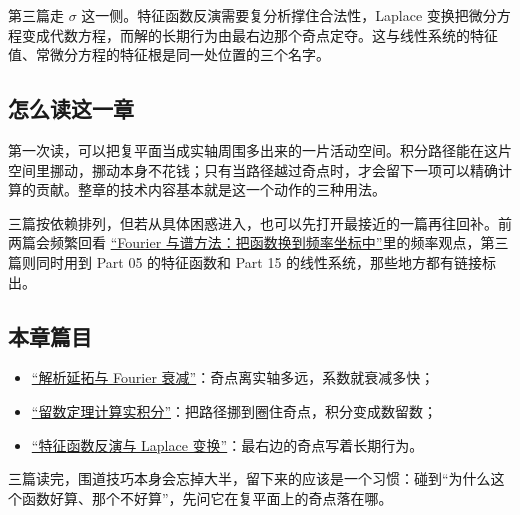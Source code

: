 第三篇走 \(\sigma\) 这一侧。特征函数反演需要复分析撑住合法性，Laplace 变换把微分方程变成代数方程，而解的长期行为由最右边那个奇点定夺。这与线性系统的特征值、常微分方程的特征根是同一处位置的三个名字。

\subsection{怎么读这一章}

第一次读，可以把复平面当成实轴周围多出来的一片活动空间。积分路径能在这片空间里挪动，挪动本身不花钱；只有当路径越过奇点时，才会留下一项可以精确计算的贡献。整章的技术内容基本就是这一个动作的三种用法。

三篇按依赖排列，但若从具体困惑进入，也可以先打开最接近的一篇再往回补。前两篇会频繁回看 \hyperref[ch:068]{``Fourier 与谱方法：把函数换到频率坐标中''}里的频率观点，第三篇则同时用到 Part 05 的特征函数和 Part 15 的线性系统，那些地方都有链接标出。

\subsection{本章篇目}

\begin{itemize}
\tightlist
\item \hyperref[sec:08-Numerical-Analysis/09-Complex-Analysis-and-Residues/01]{``解析延拓与 Fourier 衰减''}：奇点离实轴多远，系数就衰减多快；
\item \hyperref[sec:08-Numerical-Analysis/09-Complex-Analysis-and-Residues/02]{``留数定理计算实积分''}：把路径挪到圈住奇点，积分变成数留数；
\item \hyperref[sec:08-Numerical-Analysis/09-Complex-Analysis-and-Residues/03]{``特征函数反演与 Laplace 变换''}：最右边的奇点写着长期行为。
\end{itemize}

三篇读完，围道技巧本身会忘掉大半，留下来的应该是一个习惯：碰到``为什么这个函数好算、那个不好算''，先问它在复平面上的奇点落在哪。
